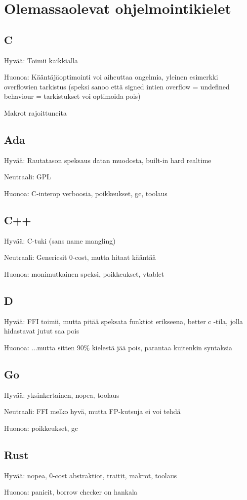 \section{Olemassaolevat ohjelmointikielet}

\subsection{C}

Hyvää: Toimii kaikkialla

Huonoa: Kääntäjäoptimointi voi aiheuttaa ongelmia, yleinen esimerkki
overflowien tarkistus (speksi sanoo että signed intien overflow = undefined
behaviour = tarkistukset voi optimoida pois)

Makrot rajoittuneita

\subsection{Ada}

Hyvää: Rautatason speksaus datan muodosta, built-in hard realtime

Neutraali: GPL

Huonoa: C-interop verboosia, poikkeukset, gc, toolaus

\subsection{C++}

Hyvää: C-tuki (sans name mangling)

Neutraali: Genericsit 0-cost, mutta hitaat kääntää

Huonoa: monimutkainen speksi, poikkeukset, vtablet

\subsection{D}

Hyvää: FFI toimii, mutta pitää speksata funktiot erikseena, better c -tila, jolla hidastavat jutut saa pois

Huonoa: ...mutta sitten 90\% kielestä jää pois, parantaa kuitenkin syntaksia

\subsection{Go}

Hyvää: yksinkertainen, nopea, toolaus

Neutraali: FFI melko hyvä, mutta FP-kutsuja ei voi tehdä

Huonoa: poikkeukset, gc

\subsection{Rust} 

Hyvää: nopea, 0-cost abstraktiot, traitit, makrot, toolaus

Huonoa: panicit, borrow checker on hankala
